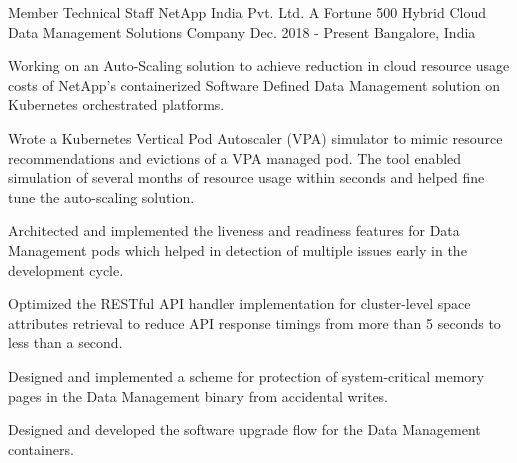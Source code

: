 

\begin{cventries}

  \expentry
    {Member Technical Staff} %
    {NetApp India Pvt. Ltd.} %
    {A Fortune 500 Hybrid Cloud Data Management Solutions Company} %
    {Dec. 2018 - Present} %
    {Bangalore, India} %
    {
      \begin{cvitems} %
        \item {Working on an Auto-Scaling solution to achieve reduction in cloud resource usage costs of NetApp's containerized Software Defined Data Management solution on Kubernetes orchestrated platforms.}
        \item {Wrote a Kubernetes Vertical Pod Autoscaler (VPA) simulator to mimic resource recommendations and evictions of a VPA managed pod. The tool enabled simulation of several months of resource usage within seconds and helped fine tune the auto-scaling solution.}
        \item {Architected and implemented the liveness and readiness features for Data Management pods which helped in detection of multiple issues early in the development cycle.}
        \item {Optimized the RESTful API handler implementation for cluster-level space attributes retrieval to reduce API response timings from more than 5 seconds to less than a second.}
        \item {Designed and implemented a scheme for protection of system-critical memory pages in the Data Management binary from accidental writes.}
        \item {Designed and developed the software upgrade flow for the Data Management containers.}
      \end{cvitems}
    }


\end{cventries}

